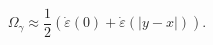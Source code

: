\begin{equation}
\Omega_\gamma \approx
\frac{1}{2}(\dot{\varepsilon}(0)+\dot{\varepsilon}(|y-x|)).
\end{equation}

